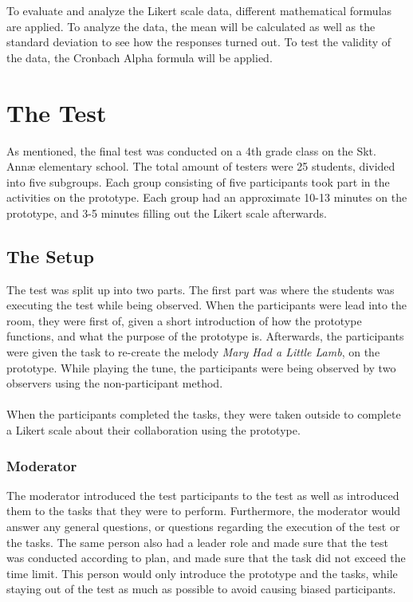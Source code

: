 To evaluate and analyze the Likert scale data, different mathematical formulas are applied. To analyze the data, the mean will be calculated as well as the standard deviation to see how the responses turned out. To test the validity of the data, the Cronbach Alpha formula will be applied\cite{DAEBook}.

\section{The Test}
As mentioned, the final test was conducted on a 4th grade class on the Skt. Annæ elementary school. The total amount of testers were 25 students, divided into five subgroups. Each group consisting of five participants took part in the activities on the prototype. Each group had an approximate 10-13 minutes on the prototype, and 3-5 minutes filling out the Likert scale afterwards.

\subsection{The Setup}
The test was split up into two parts. The first part was where the students was executing the test while being observed. When the participants were lead into the room, they were first of, given a short introduction of how the prototype functions, and what the purpose of the prototype is. Afterwards, the participants were given the task to re-create the melody \textit{Mary Had a Little Lamb}, on the prototype. While playing the tune, the participants were being observed by two observers using the non-participant method\cite[p.~64-67]{bjoernerBog}. \\\\
When the participants completed the tasks, they were taken outside to complete a Likert scale about their collaboration using the prototype. 

\subsubsection*{Moderator}
The moderator introduced the test participants to the test as well as introduced them to the tasks that they were to perform. Furthermore, the moderator would answer any general questions, or questions regarding the execution of the test or the tasks. The same person also had a leader role and made sure that the test was conducted according to plan, and made sure that the task did not exceed the time limit. This person would only introduce the prototype and the tasks, while staying out of the test as much as possible to avoid causing biased participants\cite{bjoernerBog}.

